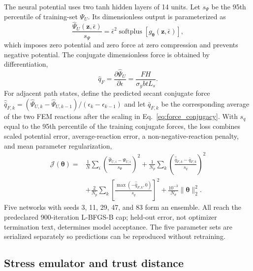 \documentclass[11pt]{article}
\begin{document}
The neural potential uses two tanh hidden layers of 14 units. Let $s_\Psi$ be the 95th percentile of training-set $\Psi_U$. Its dimensionless output is parameterized as
\begin{equation}
\frac{\widehat\Psi_U(\bm z,\bar\epsilon)}{s_\Psi}
=\bar\epsilon^2\operatorname{softplus}[g_{\bm\theta}(\bm z,\bar\epsilon)],
\label{eq:energy_architecture}
\end{equation}
which imposes zero potential and zero force at zero compression and prevents negative potential. The conjugate dimensionless force is obtained by differentiation,
\begin{equation}
\widehat q_F=\frac{\partial\widehat\Psi_U}{\partial\epsilon}
=\frac{FH}{\sigma_ybtL_s}.
\label{eq:force_conjugacy}
\end{equation}
For adjacent path states, define the predicted secant conjugate force $\widehat{\bar q}_{F,k}=(\widehat\Psi_{U,k}-\widehat\Psi_{U,k-1})/(\epsilon_k-\epsilon_{k-1})$ and let $\bar q_{F,k}$ be the corresponding average of the two FEM reactions after the scaling in Eq.~\eqref{eq:force_conjugacy}. With $s_q$ equal to the 95th percentile of the training conjugate forces, the loss combines scaled potential error, average-reaction error, a non-negative-reaction penalty, and mean parameter regularization,
\begin{align}
\mathcal J(\bm\theta)=&\frac{1}{N}\sum_i
\left(\frac{\widehat\Psi_{U,i}-\Psi_{U,i}}{s_\Psi}\right)^2
+\frac{1}{N_p}\sum_k
\left(\frac{\widehat{\bar q}_{F,k}-\bar q_{F,k}}{s_q}\right)^2\nonumber\\
&+\frac{2}{N_p}\sum_k
\left[\frac{\max(-\widehat{\bar q}_{F,k},0)}{s_q}\right]^2
+\frac{10^{-3}}{N_\theta}\|\bm\theta\|_2^2.
\label{eq:energy_loss}
\end{align}
Five networks with seeds 3, 11, 29, 47, and 83 form an ensemble. All reach the predeclared 900-iteration L-BFGS-B cap; held-out error, not optimizer termination text, determines model acceptance. The five parameter sets are serialized separately so predictions can be reproduced without retraining.

\subsection{Stress emulator and trust distance}
\end{document}
